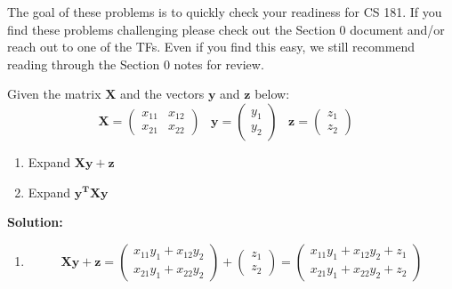 \documentclass{harvardml}
\theoremstyle{definition}
\theoremstyle{plain}
\begin{document}
\begin{center} The goal of these problems is to quickly check your readiness for CS 181. If you find these problems challenging please check out the Section 0 document and/or reach out to one of the TFs. Even if you find this easy, we still recommend reading through the Section 0 notes for review. \end{center}

\begin{problem}
		    Given the matrix $\mathbf{X}$ and the vectors $\mathbf{y}$ and $\mathbf{z}$  below:
		    \begin{equation}
		        \mathbf{X} = \begin{pmatrix}
		        x_{11} & x_{12}\\
		        x_{21} & x_{22}
		        \end{pmatrix} \hspace{10pt} \mathbf{y} = \begin{pmatrix} y_{1} \\ y_{2} \end{pmatrix} \hspace{10pt} \mathbf{z} = \begin{pmatrix} z_{1} \\ z_{2} \end{pmatrix} \hspace{10pt} 
		    \end{equation}  
		    \begin{enumerate}[label=(\alph*)]
		        \item Expand $\mathbf{X}\mathbf{y} + \mathbf{z}$ 
		        
		        \item Expand $\mathbf{y^T}\mathbf{X}\mathbf{y}$

		    \end{enumerate}
		\textbf{Solution:} 
		\begin{enumerate}[label=(\alph*)]
		        \item 
		        \begin{equation}
		        \mathbf{X y + z} = \begin{pmatrix}
		                        x_{11}y_{1} + x_{12}y_{2} \\
		                        x_{21}y_{1} + x_{22}y_{2}
		                        \end{pmatrix} +  \begin{pmatrix}
		                        z_1 \\
		                        z_2
		                        \end{pmatrix} = \begin{pmatrix}
		                        x_{11}y_{1} + x_{12}y_{2} + z_1 \\
		                        x_{21}y_{1} + x_{22}y_{2} + z_2
		                        \end{pmatrix} \nonumber
		        \end{equation}
		        

\end{enumerate}
\end{problem}
\end{document}
